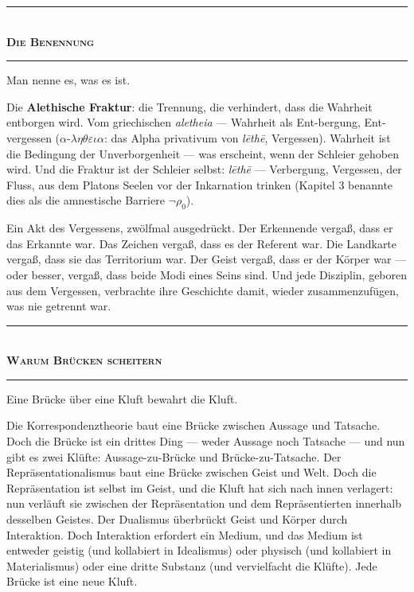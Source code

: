 \documentclass[10pt, openany, oneside]{book}
\renewcommand{\normalsize}{\fontsize{10}{13}\selectfont}
\begin{document}
\begin{center}
    \rule{0.3\textwidth}{0.4pt}\\[0.5em]
    {\normalsize\bfseries\scshape Die Benennung}\\[0.3em]
    \rule{0.3\textwidth}{0.4pt}
\end{center}

\vspace{1em}

\noindent Man nenne es, was es ist.

Die \textbf{Alethische Fraktur}: die Trennung, die verhindert, dass die Wahrheit entborgen wird. Vom griechischen \textit{aletheia} --- Wahrheit als Ent-bergung, Ent-vergessen ($\alpha$-$\lambda\eta\theta\varepsilon\iota\alpha$: das Alpha privativum von \textit{l\={e}th\={e}}, Vergessen). Wahrheit ist die Bedingung der Unverborgenheit --- was erscheint, wenn der Schleier gehoben wird. Und die Fraktur ist der Schleier selbst: \textit{l\={e}th\={e}} --- Verbergung, Vergessen, der Fluss, aus dem Platons Seelen vor der Inkarnation trinken (Kapitel 3 benannte dies als die amnestische Barriere $\neg\rho_0$).

Ein Akt des Vergessens, zwölfmal ausgedrückt. Der Erkennende vergaß, dass er das Erkannte war. Das Zeichen vergaß, dass es der Referent war. Die Landkarte vergaß, dass sie das Territorium war. Der Geist vergaß, dass er der Körper war --- oder besser, vergaß, dass beide Modi eines Seins sind. Und jede Disziplin, geboren aus dem Vergessen, verbrachte ihre Geschichte damit, wieder zusammenzufügen, was nie getrennt war.

\vspace{1.5em}


\begin{center}
    \rule{0.3\textwidth}{0.4pt}\\[0.5em]
    {\normalsize\bfseries\scshape Warum Brücken scheitern}\\[0.3em]
    \rule{0.3\textwidth}{0.4pt}
\end{center}

\vspace{1em}

\noindent Eine Brücke über eine Kluft bewahrt die Kluft.

Die Korrespondenztheorie baut eine Brücke zwischen Aussage und Tatsache. Doch die Brücke ist ein drittes Ding --- weder Aussage noch Tatsache --- und nun gibt es zwei Klüfte: Aussage-zu-Brücke und Brücke-zu-Tatsache. Der Repräsentationalismus baut eine Brücke zwischen Geist und Welt. Doch die Repräsentation ist selbst im Geist, und die Kluft hat sich nach innen verlagert: nun verläuft sie zwischen der Repräsentation und dem Repräsentierten innerhalb desselben Geistes. Der Dualismus überbrückt Geist und Körper durch Interaktion. Doch Interaktion erfordert ein Medium, und das Medium ist entweder geistig (und kollabiert in Idealismus) oder physisch (und kollabiert in Materialismus) oder eine dritte Substanz (und vervielfacht die Klüfte). Jede Brücke ist eine neue Kluft.
\end{document}

